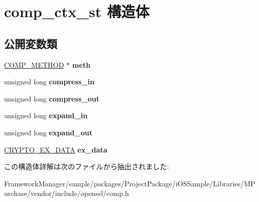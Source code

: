 \hypertarget{structcomp__ctx__st}{}\section{comp\+\_\+ctx\+\_\+st 構造体}
\label{structcomp__ctx__st}
\subsection*{公開変数類}
\begin{DoxyCompactItemize}
\item 
\hypertarget{structcomp__ctx__st_accd49b9ff8bafe3fa01c8cadc597b855}{}\hyperlink{structcomp__method__st}{C\+O\+M\+P\+\_\+\+M\+E\+T\+H\+O\+D} $\ast$ {\bfseries meth}\label{structcomp__ctx__st_accd49b9ff8bafe3fa01c8cadc597b855}

\item 
\hypertarget{structcomp__ctx__st_a4a67c3eda213508177bedaaae237f8c4}{}unsigned long {\bfseries compress\+\_\+in}\label{structcomp__ctx__st_a4a67c3eda213508177bedaaae237f8c4}

\item 
\hypertarget{structcomp__ctx__st_a4ad823d6c60afbb5d0951f97b3f2e787}{}unsigned long {\bfseries compress\+\_\+out}\label{structcomp__ctx__st_a4ad823d6c60afbb5d0951f97b3f2e787}

\item 
\hypertarget{structcomp__ctx__st_a14c4bacc851d14791e566f11624f9a8e}{}unsigned long {\bfseries expand\+\_\+in}\label{structcomp__ctx__st_a14c4bacc851d14791e566f11624f9a8e}

\item 
\hypertarget{structcomp__ctx__st_acddf6014a55ffef5a232046f63d4f8a6}{}unsigned long {\bfseries expand\+\_\+out}\label{structcomp__ctx__st_acddf6014a55ffef5a232046f63d4f8a6}

\item 
\hypertarget{structcomp__ctx__st_ab5069d63997ca03596aeadb5f03f37ec}{}\hyperlink{structcrypto__ex__data__st}{C\+R\+Y\+P\+T\+O\+\_\+\+E\+X\+\_\+\+D\+A\+T\+A} {\bfseries ex\+\_\+data}\label{structcomp__ctx__st_ab5069d63997ca03596aeadb5f03f37ec}

\end{DoxyCompactItemize}


この構造体詳解は次のファイルから抽出されました\+:\begin{DoxyCompactItemize}
\item 
Framework\+Manager/sample/packages/\+Project\+Package/i\+O\+S\+Sample/\+Libraries/\+M\+Purchase/vendor/include/openssl/comp.\+h\end{DoxyCompactItemize}
